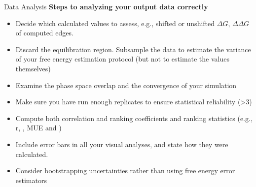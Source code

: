 \documentclass[9pt,bestpractices]{livecoms}
\begin{document}
\begin{Checklists*}
\begin{checklist}{Data Analysis}
    \textbf{Steps to analyzing your output data correctly}
\begin{itemize}
    \item Decide which calculated values to assess, e.g., shifted or unshifted $\Delta G$,  $\Delta \Delta G$ of computed edges.
    \item Discard the equilibration region. Subsample the data to estimate the variance of your free energy estimation protocol (but not to estimate the values themselves)
    \item Examine the phase space overlap and the convergence of your simulation
    \item Make sure you have run enough replicates to ensure statistical reliability (\textgreater3)
    \item Compute both correlation and ranking coefficients and ranking statistics (e.g., r, \textrho, MUE and \texttau)
    \item Include error bars in all your visual analyses, and state how they were calculated.
    \item Consider bootstrapping uncertainties rather than using free energy error estimators
\end{itemize}
\end{checklist}
\end{Checklists*}
\clearpage

\end{document}
